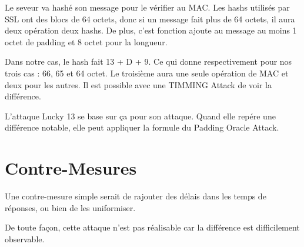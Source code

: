 Le seveur va hashé son message pour le vérifier au MAC. Les hashs utilisés par SSL
ont des blocs de 64 octets, donc si un message fait plus de 64 octets, il aura deux
opération deux hashs. De plus, c'est fonction ajoute au message au moins 1 octet de 
padding et 8 octet pour la longueur.

Dans notre cas, le hash fait 13 + D + 9. Ce qui donne respectivement pour nos trois cas :
66, 65 et 64 octet. Le troisième aura une seule opération de MAC et deux pour les autres.
Il est possible avec une TIMMING Attack de voir la différence. 

L'attaque Lucky 13 se base sur ça pour son attaque. Quand elle repére une différence
notable, elle peut appliquer la formule du Padding Oracle Attack.

\section{Contre-Mesures}
\label{sec:cmL13}

Une contre-mesure simple serait de rajouter des délais dans les temps de réponses,
ou bien de les uniformiser.

De toute façon, cette attaque n'est pas réalisable car la différence est difficilement observable. 

